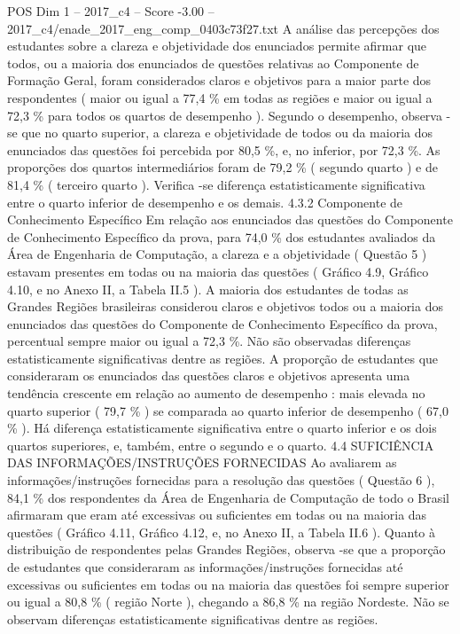 \begin{textsample}{POS Dim 1 – 2017\_c4 – Score -3.00 – 2017\_c4/enade\_2017\_eng\_comp\_0403c73f27.txt}
A análise das percepções dos estudantes sobre a clareza e objetividade dos enunciados permite afirmar que todos, ou a maioria dos enunciados de questões relativas ao Componente de Formação Geral, foram considerados claros e objetivos para a maior parte dos respondentes ( maior ou igual a 77,4 \% em todas as regiões e maior ou igual a 72,3 \% para todos os quartos de desempenho ).
Segundo o desempenho, observa -se que no quarto superior, a clareza e objetividade de todos ou da maioria dos enunciados das questões foi percebida por 80,5 \%, e, no inferior, por 72,3 \%.
As proporções dos quartos intermediários foram de 79,2 \% ( segundo quarto ) e de 81,4 \% ( terceiro quarto ).
Verifica -se diferença estatisticamente significativa entre o quarto inferior de desempenho e os demais. 4.3.2 Componente de Conhecimento Específico Em relação aos enunciados das questões do Componente de Conhecimento Específico da prova, para 74,0 \% dos estudantes avaliados da Área de Engenharia de Computação, a clareza e a objetividade ( Questão 5 ) estavam presentes em todas ou na maioria das questões ( Gráfico 4.9, Gráfico 4.10, e no Anexo II, a Tabela II.5 ).
A maioria dos estudantes de todas as Grandes Regiões brasileiras considerou claros e objetivos todos ou a maioria dos enunciados das questões do Componente de Conhecimento Específico da prova, percentual sempre maior ou igual a 72,3 \%.
Não são observadas diferenças estatisticamente significativas dentre as regiões.
A proporção de estudantes que consideraram os enunciados das questões claros e objetivos apresenta uma tendência crescente em relação ao aumento de desempenho : mais elevada no quarto superior ( 79,7 \% ) se comparada ao quarto inferior de desempenho ( 67,0 \% ).
Há diferença estatisticamente significativa entre o quarto inferior e os dois quartos superiores, e, também, entre o segundo e o quarto. 4.4 SUFICIÊNCIA DAS INFORMAÇÕES/INSTRUÇÕES FORNECIDAS Ao avaliarem as informações/instruções fornecidas para a resolução das questões ( Questão 6 ), 84,1 \% dos respondentes da Área de Engenharia de Computação de todo o Brasil afirmaram que eram até excessivas ou suficientes em todas ou na maioria das questões ( Gráfico 4.11, Gráfico 4.12, e, no Anexo II, a Tabela II.6 ).
Quanto à distribuição de respondentes pelas Grandes Regiões, observa -se que a proporção de estudantes que consideraram as informações/instruções fornecidas até excessivas ou suficientes em todas ou na maioria das questões foi sempre superior ou igual a 80,8 \% ( região Norte ), chegando a 86,8 \% na região Nordeste.
Não se observam diferenças estatisticamente significativas dentre as regiões.

\end{textsample}
